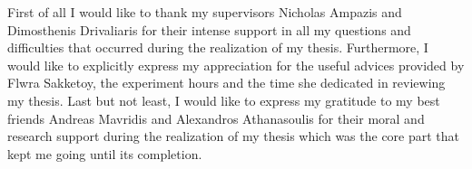 
First of all I would like to thank my supervisors Nicholas Ampazis and
Dimosthenis Drivaliaris for their intense support in all my questions and difficulties
that occurred during the realization of my thesis. Furthermore, I would like
to explicitly express my appreciation for the useful advices provided by
Flwra Sakketoy, the experiment hours and the time she dedicated in reviewing my thesis.
Last but not least, I would like to express my gratitude to my best friends
Andreas Mavridis and Alexandros Athanasoulis for their moral and research support
during the realization of my thesis which was the core part that kept me going
until its completion.
